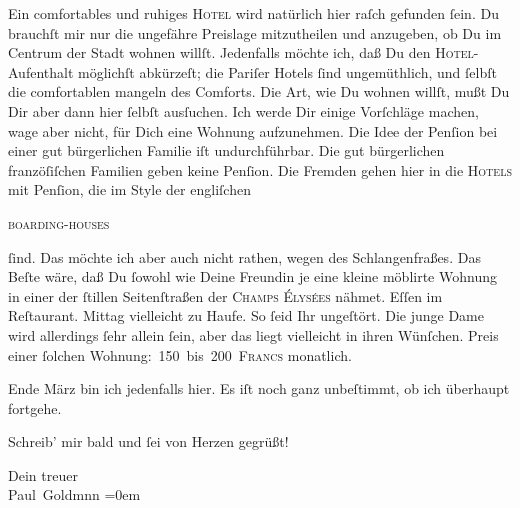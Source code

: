 \pstart
           Ein comfortables und ruhiges \textsc{Hotel} wird natürlich hier  raſch gefunden ſein. Du brauchſt mir nur die
               ungefähre  Preislage mitzutheilen und anzugeben,
               ob Du im Centrum der Stadt
               wohnen willſt. Jedenfalls möchte ich, daß Du den \textsc{Hotel}-Aufenthalt möglichſt abkürzeſt; die Pariſer Hotels ſind ungemüthlich, und ſelbſt die comfortablen mangeln des
               Comforts. Die Art, wie Du wohnen willſt, mußt Du Dir aber dann hier ſelbſt ausſuchen.
               Ich werde Dir einige Vorſchläge machen, wage aber nicht, für Dich {\pb}eine Wohnung aufzunehmen. Die Idee der Penſion bei
               einer gut bürgerlichen Familie iſt undurchführbar. Die gut bürgerlichen franzöſiſchen Familien geben
               keine Penſion. Die Fremden gehen hier in die \textsc{Hotels} mit
               Penſion, die im Style der engliſchen{ }\begin{otherlanguage}{english}\textsc{boarding-houses}\end{otherlanguage}{ }ſind. Das möchte ich aber auch nicht rathen, wegen
               des Schlangenfraßes. Das Beſte wäre, daß Du ſowohl wie Deine Freundin je eine kleine möblirte Wohnung in
               einer der ſtillen Seitenſtraßen der \textsc{Champs Élysées} nähmet. Eſſen im Reſtaurant. \strikeout{\textcolor{gray}{×}} Mittag vielleicht zu Haufe. {\pb}So ſeid Ihr
               ungeſtört. Die junge Dame
               wird allerdings ſehr allein ſein, aber das liegt vielleicht in ihren Wünſchen. Preis
               einer ſolchen Wohnung: 150 bis 200 \textsc{Francs} monatlich.\pend
           
\pstart
            Ende März bin ich jedenfalls hier. Es iſt noch
               ganz unbeſtimmt, ob ich überhaupt fortgehe.\pend
           
\pstart
           Schreib’ mir bald und ſei von Herzen gegrüßt!\pend
           
\pstart
           Dein treuer {\\[\baselineskip]}\spacefill\mbox{Paul Goldmnn}\pend
           \leftskip=0em{}\endnumbering{}  
      